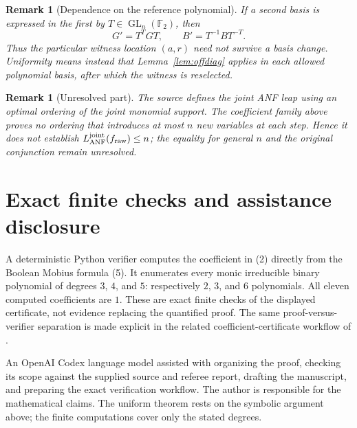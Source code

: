 \documentclass[11pt]{article}
\newtheorem{remark}[theorem]{Remark}
\newcommand{\F}{\mathbb F}
\begin{document}
\begin{remark}[Dependence on the reference polynomial]
If a second basis is expressed in the first by $T\in\operatorname{GL}_n
(\F_2)$, then
\[
                  G'=T^TGT,\qquad B'=T^{-1}BT^{-T}.
\]
Thus the particular witness location $(a,r)$ need not survive a basis
change.  Uniformity means instead that Lemma~\ref{lem:offdiag} applies in
each allowed polynomial basis, after which the witness is reselected.
\end{remark}

\begin{remark}[Unresolved part]
The source \cite{ZhangZhang2026} defines the joint ANF leap using an
optimal ordering of the joint monomial support.  The coefficient family
above proves no ordering that introduces at most $n$ new variables at each
step.  Hence it does not establish
$L_{\rm ANF}^{\rm joint}(f_{\rm raw})\leq n$; the equality for general
$n$ and the original conjunction remain unresolved.
\end{remark}

\section{Exact finite checks and assistance disclosure}

A deterministic Python verifier computes the coefficient in (2) directly
from the Boolean Mobius formula (5).  It enumerates every monic irreducible
binary polynomial of degrees $3$, $4$, and $5$: respectively $2$, $3$, and
$6$ polynomials.  All eleven computed coefficients are $1$.  These are
exact finite checks of the displayed certificate, not evidence replacing
the quantified proof.  The same proof-versus-verifier separation is made
explicit in the related coefficient-certificate workflow of
\cite{202608.1194}.

An OpenAI Codex language model assisted with organizing the proof, checking
its scope against the supplied source and referee report, drafting the
manuscript, and preparing the exact verification workflow.  The author is
responsible for the mathematical claims.  The uniform theorem rests on the
symbolic argument above; the finite computations cover only the stated
degrees.

\begingroup
\raggedright


\endgroup
\end{document}
